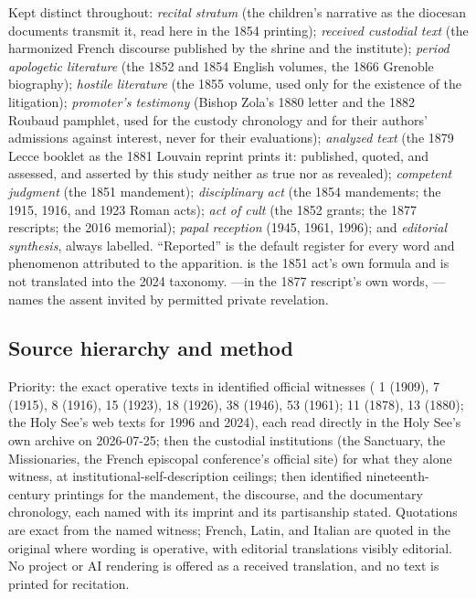 Kept distinct throughout: \emph{recital stratum} (the children's
narrative as the diocesan documents transmit it, read here in the
1854 printing); \emph{received custodial text} (the harmonized
French discourse published by the shrine and the institute);
\emph{period apologetic literature} (the 1852 and 1854 English
volumes, the 1866 Grenoble biography); \emph{hostile literature}
(the 1855 volume, used only for the existence of the litigation);
\emph{promoter's testimony} (Bishop Zola's 1880 letter and the 1882
Roubaud pamphlet, used for the custody chronology and for their
authors' admissions against interest, never for their evaluations);
\emph{analyzed text} (the 1879 Lecce booklet as the 1881 Louvain
reprint prints it: published, quoted, and assessed, and asserted by
this study neither as true nor as revealed);
\emph{competent judgment} (the 1851
mandement); \emph{disciplinary act} (the 1854 mandements; the 1915,
1916, and 1923 Roman acts); \emph{act of cult} (the 1852 grants; the
1877 rescripts; the 2016 memorial); \emph{papal reception} (1945,
1961, 1996); and \emph{editorial synthesis}, always labelled.
``Reported'' is the default register for every word and phenomenon
attributed to the apparition.  is the 1851 act's own formula and is not translated into
the 2024 taxonomy. ---in the 1877 rescript's own
words, ---names the assent invited by
permitted private revelation.

\subsection*{Source hierarchy and method}

Priority: the exact operative texts in identified official witnesses
( 1 (1909), 7 (1915), 8 (1916), 15 (1923), 18 (1926), 38
(1946), 53 (1961);  11 (1878), 13 (1880); the Holy See's
web texts for 1996 and 2024), each read directly in the Holy See's
own archive on 2026-07-25; then the custodial institutions (the
Sanctuary, the Missionaries, the French episcopal conference's
official site) for what they alone witness, at
institutional-self-description ceilings; then identified
nineteenth-century printings for the mandement, the discourse, and
the documentary chronology, each named with its imprint and its
partisanship stated. Quotations are exact from the named witness;
French, Latin, and Italian are quoted in the original where wording
is operative, with editorial translations visibly editorial. No
project or AI rendering is offered as a received translation, and no
text is printed for recitation.

